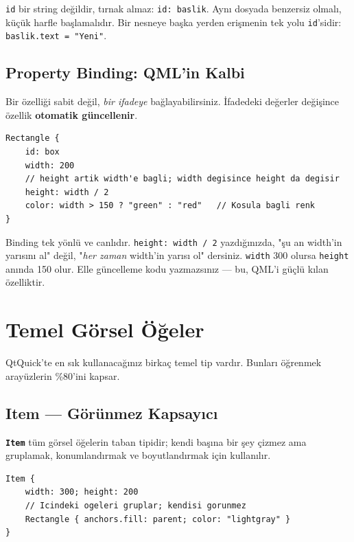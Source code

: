 \documentclass[11pt,a4paper]{article}
\newcommand{\kls}[1]{\texttt{\color{anaMavi}\textbf{#1}}}
\newcommand{\kod}[1]{\texttt{\color{koyuGri}#1}}
\begin{document}
\begin{ipucukutu}
\kod{id} bir string değildir, tırnak almaz: \kod{id: baslik}. Aynı dosyada
benzersiz olmalı, küçük harfle başlamalıdır. Bir nesneye başka yerden erişmenin
tek yolu \kod{id}'sidir: \kod{baslik.text = "Yeni"}.
\end{ipucukutu}

\subsection{Property Binding: QML'in Kalbi}

Bir özelliği sabit değil, \emph{bir ifadeye} bağlayabilirsiniz. İfadedeki değerler
değişince özellik \textbf{otomatik güncellenir}.

\begin{lstlisting}
Rectangle {
    id: box
    width: 200
    // height artik width'e bagli; width degisince height da degisir
    height: width / 2
    color: width > 150 ? "green" : "red"   // Kosula bagli renk
}
\end{lstlisting}

\begin{bilgikutu}
Binding tek yönlü ve canlıdır. \kod{height: width / 2} yazdığınızda, "şu an
width'in yarısını al" değil, "\emph{her zaman} width'in yarısı ol" dersiniz.
\kod{width} 300 olursa \kod{height} anında 150 olur. Elle güncelleme kodu
yazmazsınız — bu, QML'i güçlü kılan özelliktir.
\end{bilgikutu}

\section{Temel Görsel Öğeler}

QtQuick'te en sık kullanacağınız birkaç temel tip vardır. Bunları öğrenmek
arayüzlerin \%80'ini kapsar.

\subsection{Item — Görünmez Kapsayıcı}

\kls{Item} tüm görsel öğelerin taban tipidir; kendi başına bir şey çizmez ama
gruplamak, konumlandırmak ve boyutlandırmak için kullanılır.

\begin{lstlisting}
Item {
    width: 300; height: 200
    // Icindeki ogeleri gruplar; kendisi gorunmez
    Rectangle { anchors.fill: parent; color: "lightgray" }
}
\end{lstlisting}
\end{document}
